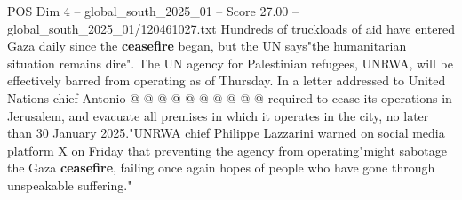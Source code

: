 \begin{textsample}{POS Dim 4 – global\_south\_2025\_01 – Score 27.00 – global\_south\_2025\_01/120461027.txt}
Hundreds of truckloads of aid have entered Gaza daily since the \textbf{ceasefire} began, but the UN says"the humanitarian situation remains dire".
The UN agency for Palestinian refugees, UNRWA, will be effectively barred from operating as of Thursday.
In a letter addressed to United Nations chief Antonio @ @ @ @ @ @ @ @ @ @ required to cease its operations in Jerusalem, and evacuate all premises in which it operates in the city, no later than 30 January 2025."UNRWA chief Philippe Lazzarini warned on social media platform X on Friday that preventing the agency from operating"might sabotage the Gaza \textbf{ceasefire}, failing once again hopes of people who have gone through unspeakable suffering."

\end{textsample}

